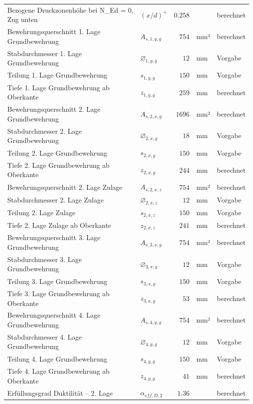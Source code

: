 \documentclass[11pt,a4paper]{article}
\begin{document}
\begin{xltabular}{\linewidth}{>{\raggedright\arraybackslash}Xlrll}
Bezogene Druckzonenhöhe bei N\_Ed = 0, Zug unten & $\left(x/d\right)^{+}$ & $0.258$ &  & berechnet \\
Bewehrungsquerschnitt 1. Lage Grundbewehrung & $A_{s,1,y,g}$ & $754$ & mm² & berechnet \\
Stabdurchmesser 1. Lage Grundbewehrung & $\varnothing_{1,y,g}$ & $12$ & mm & Vorgabe \\
Teilung 1. Lage Grundbewehrung & $s_{1,y,g}$ & $150$ & mm & Vorgabe \\
Tiefe 1. Lage Grundbewehrung ab Oberkante & $z_{1,y,g}$ & $259$ & mm & berechnet \\
Bewehrungsquerschnitt 2. Lage Grundbewehrung & $A_{s,2,x,g}$ & $1696$ & mm² & berechnet \\
Stabdurchmesser 2. Lage Grundbewehrung & $\varnothing_{2,x,g}$ & $18$ & mm & Vorgabe \\
Teilung 2. Lage Grundbewehrung & $s_{2,x,g}$ & $150$ & mm & Vorgabe \\
Tiefe 2. Lage Grundbewehrung ab Oberkante & $z_{2,x,g}$ & $244$ & mm & berechnet \\
Bewehrungsquerschnitt 2. Lage Zulage & $A_{s,2,x,z}$ & $754$ & mm² & berechnet \\
Stabdurchmesser 2. Lage Zulage & $\varnothing_{2,x,z}$ & $12$ & mm & Vorgabe \\
Teilung 2. Lage Zulage & $s_{2,x,z}$ & $150$ & mm & Vorgabe \\
Tiefe 2. Lage Zulage ab Oberkante & $z_{2,x,z}$ & $241$ & mm & berechnet \\
Bewehrungsquerschnitt 3. Lage Grundbewehrung & $A_{s,3,x,g}$ & $754$ & mm² & berechnet \\
Stabdurchmesser 3. Lage Grundbewehrung & $\varnothing_{3,x,g}$ & $12$ & mm & Vorgabe \\
Teilung 3. Lage Grundbewehrung & $s_{3,x,g}$ & $150$ & mm & Vorgabe \\
Tiefe 3. Lage Grundbewehrung ab Oberkante & $z_{3,x,g}$ & $53$ & mm & berechnet \\
Bewehrungsquerschnitt 4. Lage Grundbewehrung & $A_{s,4,y,g}$ & $754$ & mm² & berechnet \\
Stabdurchmesser 4. Lage Grundbewehrung & $\varnothing_{4,y,g}$ & $12$ & mm & Vorgabe \\
Teilung 4. Lage Grundbewehrung & $s_{4,y,g}$ & $150$ & mm & Vorgabe \\
Tiefe 4. Lage Grundbewehrung ab Oberkante & $z_{4,y,g}$ & $41$ & mm & berechnet \\
Erfüllungsgrad Duktilität – 2. Lage & $\alpha_{eff,D,2}$ & $1.36$ &  & berechnet \\

\end{xltabular}
\end{document}
